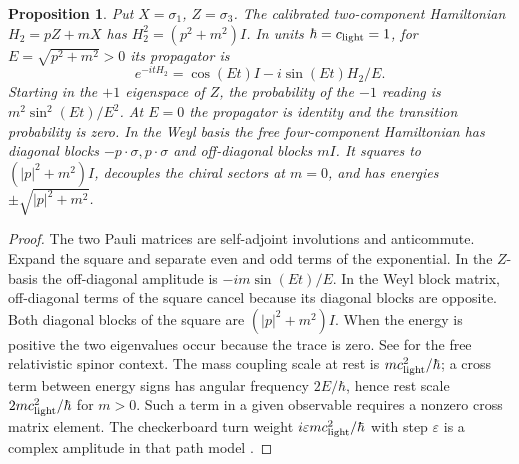 \documentclass[11pt,reqno]{amsart}
\newtheorem{proposition}[theorem]{Proposition}
\theoremstyle{definition}
\theoremstyle{remark}
\numberwithin{equation}{section}
\begin{document}
\begin{proposition}\label{m3:chiral}
Put \(X=\sigma_1\), \(Z=\sigma_3\). The calibrated two-component
Hamiltonian \(H_2=pZ+mX\) has
\(H_2^2=(p^2+m^2)I\). In units \(\hbar=c_{\rm light}=1\), for
\(E=\sqrt{p^2+m^2}>0\) its propagator is
\[
 e^{-itH_2}=\cos(Et)I-i\sin(Et)H_2/E .
\]
Starting in the \(+1\) eigenspace of \(Z\), the probability of the
\(-1\) reading is \(m^2\sin^2(Et)/E^2\). At \(E=0\) the
propagator is identity and the transition probability is zero.
In the Weyl basis the free four-component Hamiltonian has
diagonal blocks \(-p\cdot\sigma,p\cdot\sigma\) and off-diagonal
blocks \(mI\). It squares to \((|p|^2+m^2)I\), decouples the
chiral sectors at \(m=0\), and has energies \(\pm\sqrt{|p|^2+m^2}\).
\end{proposition}
\begin{proof}
The two Pauli matrices are self-adjoint involutions and anticommute.
Expand the square and separate even and odd terms of the exponential.
In the \(Z\)-basis the off-diagonal amplitude is
\(-im\sin(Et)/E\). In the Weyl block matrix, off-diagonal
terms of the square cancel because its diagonal blocks are opposite.
Both diagonal blocks of the square are
\((|p|^2+m^2)I\). When the energy is positive the two eigenvalues
occur because the trace is zero. See \cite{m3Dirac,m3Hestenes}
for the free relativistic spinor context. The mass coupling scale
at rest is \(mc_{\rm light}^2/\hbar\); a cross term between energy
signs has angular frequency \(2E/\hbar\), hence rest scale
\(2mc_{\rm light}^2/\hbar\) for \(m>0\). Such a term in a given
observable requires a nonzero cross matrix element. The
checkerboard turn weight \(i\varepsilon mc_{\rm light}^2/\hbar\)
with step \(\varepsilon\) is a complex amplitude in that path model
\cite{m3FeynmanHibbs}.
\end{proof}
\end{document}
